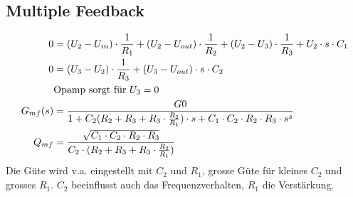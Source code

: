 \subsection{Multiple Feedback}
\begin{figure}[!h]
	\begin{center}
		 \qquad
	\end{center} 
\end{figure}
\begin{align*}
0			&=(U_2-U_{in})\cdot \frac{1}{R_1}+(U_2-U_{out})\cdot \frac{1}{R_2}+(U_2-U_3)\cdot \frac{1}{R_3}+U_2\cdot s\cdot C_1\\
0			&=(U_3-U_2)\cdot \frac{1}{R_3}+(U_3-U_{out})\cdot s\cdot C_2\\
			&\text{Opamp sorgt für }U_3=0\notag\\
G_{mf}(s)	&=\frac{G0}{1+C_2(R_2+R_3+R_3\cdot \frac{R_2}{R_1})\cdot s+C_1\cdot C_2\cdot R_2\cdot R_3\cdot s^s}\\
Q_{mf}		&=\frac{\sqrt{C_1\cdot C_2\cdot R_2\cdot R_3}}{C_2\cdot (R_2+R_3+R_3\cdot \frac{R_2}{R_1})}
\end{align*}
Die Güte wird v.a. eingestellt mit $C_2$ und $R_1$, grosse Güte für kleines
$C_2$ und grosses $R_1$. $C_2$ beeinflusst auch das Frequenzverhalten, $R_1$ die
Verstärkung.

